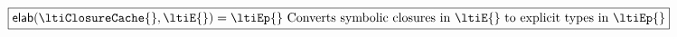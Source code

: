 \begin{figure}

%

  \[
    \boxed{\ltielimClos{\ltiClosureCache{}}{\ltiE{}}{\ltiEp{}}
    \text{ Converts symbolic closures in \ltiE{} to explicit types in \ltiEp{}}
    }
  \]


\end{figure}

